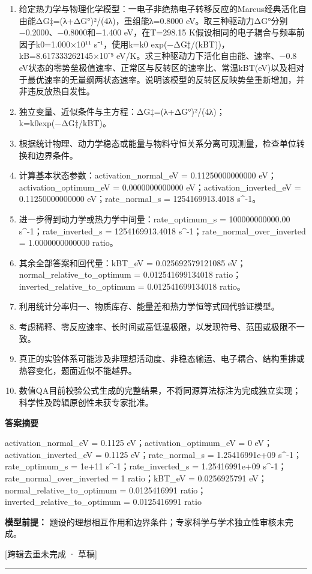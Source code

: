 \documentclass[UTF8,11pt,a4paper]{ctexart}
\begin{document}
\begin{enumerate}
\item 给定热力学与物理化学模型：一电子非绝热电子转移反应的Marcus经典活化自由能ΔG‡=(λ+ΔG°)²/(4λ)，重组能λ=0.8000 eV。取三种驱动力ΔG°分别−0.2000、−0.8000和−1.400 eV，在T=298.15 K假设相同的电子耦合与频率前因子k0=1.000×10¹¹ s⁻¹，使用k=k0 exp(−ΔG‡/(kBT))，kB=8.617333262145×10⁻⁵ eV/K。求三种驱动力下活化自由能、速率、−0.8 eV状态的零势垒极值速率、正常区与反转区的速率比、常温kBT(eV)以及相对于最优速率的无量纲两状态速率。说明该模型的反转区反映势垒重新增加，并非违反放热自发性。
\item 独立变量、近似条件与主方程：ΔG‡=(λ+ΔG°)²/(4λ)；k=k0exp(−ΔG‡/kBT)。
\item 根据统计物理、动力学稳态或能量与物料守恒关系分离可观测量，检查单位转换和边界条件。
\item 计算基本状态参数：activation\_normal\_eV = 0.11250000000000 eV；activation\_optimum\_eV = 0.0000000000000 eV；activation\_inverted\_eV = 0.11250000000000 eV；rate\_normal\_s = 1254169913.4018 s\textasciicircum{}-1。
\item 进一步得到动力学或热力学中间量：rate\_optimum\_s = 100000000000.00 s\textasciicircum{}-1；rate\_inverted\_s = 1254169913.4018 s\textasciicircum{}-1；rate\_normal\_over\_inverted = 1.0000000000000 ratio。
\item 其余全部答案和回代量：kBT\_eV = 0.025692579121085 eV；normal\_relative\_to\_optimum = 0.012541699134018 ratio；inverted\_relative\_to\_optimum = 0.012541699134018 ratio。
\item 利用统计分率归一、物质库存、能量差和热力学恒等式回代验证模型。
\item 考虑稀释、零反应速率、长时间或高低温极限，以发现符号、范围或极限不一致。
\item 真正的实验体系可能涉及非理想活动度、非稳态输运、电子耦合、结构重排或热容变化，题面近似不能越界。
\item 数值QA目前校验公式生成的完整结果，不将同源算法标注为完成独立实现；科学性及跨辑原创性未获专家批准。
\end{enumerate}
\noindent\textbf{答案摘要}\par
activation\_normal\_eV = 0.1125 eV；activation\_optimum\_eV = 0 eV；activation\_inverted\_eV = 0.1125 eV；rate\_normal\_s = 1.25416991e+09 s\textasciicircum{}-1；rate\_optimum\_s = 1e+11 s\textasciicircum{}-1；rate\_inverted\_s = 1.25416991e+09 s\textasciicircum{}-1；rate\_normal\_over\_inverted = 1 ratio；kBT\_eV = 0.0256925791 eV；normal\_relative\_to\_optimum = 0.0125416991 ratio；inverted\_relative\_to\_optimum = 0.0125416991 ratio\par
\noindent\textbf{模型前提：}
题设的理想相互作用和边界条件；专家科学与学术独立性审核未完成。\par
\noindent\textcolor{red!65!black}{[跨辑去重未完成 · 草稿]} \par
\medskip\hrule\medskip
{}
\end{document}
